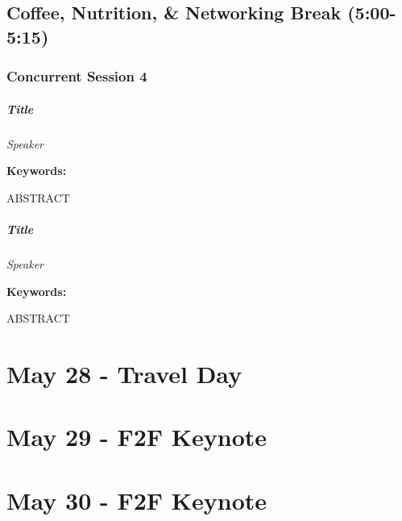 \documentclass[
]{book}
\begin{document}
\hypertarget{coffee-nutrition-networking-break-500-515}{%
\section{Coffee, Nutrition, \& Networking Break (5:00-5:15)}\label{coffee-nutrition-networking-break-500-515}}

\hypertarget{concurrent-session-4}{%
\subsection*{Concurrent Session 4}\label{concurrent-session-4}}

\begin{speaker}
\hypertarget{title}{%
\paragraph{\texorpdfstring{\textbf{Title}}{Title}}\label{title}}

\emph{Speaker}

\textbf{Keywords:}

ABSTRACT
\end{speaker}
\begin{speaker}
\hypertarget{title}{%
\paragraph{\texorpdfstring{\textbf{Title}}{Title}}\label{title}}

\emph{Speaker}

\textbf{Keywords:}

ABSTRACT
\end{speaker}

\hypertarget{may-28---travel-day}{%
\chapter{May 28 - Travel Day}\label{may-28---travel-day}}

\hypertarget{may-29---f2f-keynote}{%
\chapter{May 29 - F2F Keynote}\label{may-29---f2f-keynote}}

\hypertarget{may-30---f2f-keynote}{%
\chapter{May 30 - F2F Keynote}\label{may-30---f2f-keynote}}
\end{document}
